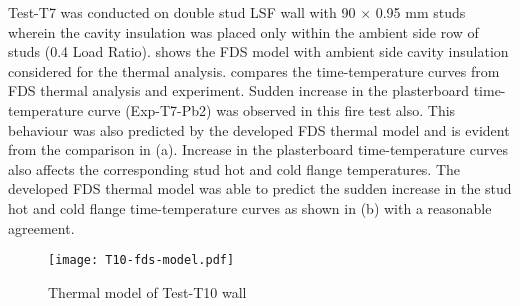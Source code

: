 Test-T7 was conducted on double stud LSF wall with 90 $\times$ 0.95 mm studs wherein the cavity insulation was placed only within the ambient side row of studs (0.4 Load Ratio).  shows the FDS model with ambient side cavity insulation considered for the thermal analysis. compares the time-temperature curves from FDS thermal analysis and experiment. Sudden increase in the plasterboard time-temperature curve (Exp-T7-Pb2) was observed in this fire test also. This behaviour was also predicted by the developed FDS thermal model and is evident from the comparison in  (a). Increase in the plasterboard time-temperature curves also affects the corresponding stud hot and cold flange temperatures. The developed FDS thermal model was able to predict the sudden increase in the stud hot and cold flange time-temperature curves as shown in  (b) with a reasonable agreement. 
\begin{figure}[!htbp]
	\centering
		\texttt{[image: T10-fds-model.pdf]}
		\caption{Thermal model of Test-T10 wall}
		\label{fig:T10-fds-model-cavity}
\end{figure}

